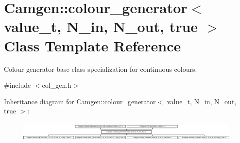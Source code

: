 \hypertarget{a00079}{}\section{Camgen\+:\+:colour\+\_\+generator$<$ value\+\_\+t, N\+\_\+in, N\+\_\+out, true $>$ Class Template Reference}
\label{a00079}


Colour generator base class specialization for continuous colours.  




{\ttfamily \#include $<$col\+\_\+gen.\+h$>$}

Inheritance diagram for Camgen\+:\+:colour\+\_\+generator$<$ value\+\_\+t, N\+\_\+in, N\+\_\+out, true $>$\+:\begin{figure}[H]
\begin{center}
\leavevmode
\includegraphics[height=1.009615cm]{a00079}
\end{center}
\end{figure}
